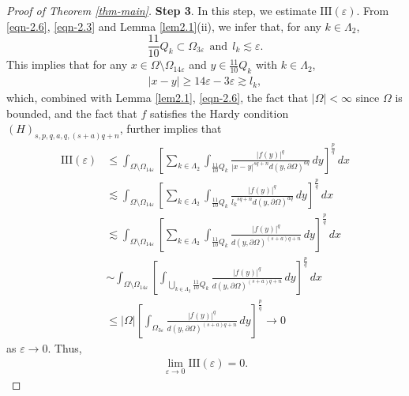 \documentclass[11pt,twoside]{article}
\def\Qk{\frac{11}{10}Q_k}
\def\blz{\Lambda}
\def\boz{{\Omega}}
\def\vez{\varepsilon}
\def\pa{\partial}                %
\def\huae{\varepsilon}
\def\bozthreee{\boz_{3\huae}}
\theoremstyle{mylem}
\theoremstyle{definition}
\numberwithin{equation}{section}
\begin{document}
\begin{proof}[Proof of Theorem \ref{thm-main}]
{\bf Step 3}. In this step, we estimate $\mathrm{III}(\vez)$. 
From \eqref{eqn-2.6}, \eqref{eqn-2.3} and Lemma \ref{lem2.1}(ii),
we infer that, for any $k\in\blz_2$,  
$$\Qk\subset\Omega_{3\varepsilon}
\ \ \text{and}\ \ l_k\lesssim \varepsilon.
$$
This implies that for any $x\in\Omega \setminus \Omega_{14\varepsilon}$ and $y\in\Qk$ with $k\in\blz_2$,
\begin{align}\label{eqn-8.8}
|x-y|\geq 14\varepsilon-3\varepsilon\gtrsim l_k,
\end{align}
which, combined with Lemma \ref{lem2.1}, \eqref{eqn-2.6},
the fact that $|\Omega|<\infty$ since $\Omega$ is bounded, and the fact that $f$ satisfies the Hardy condition $(H)_{s,p,q,a,q,(s+a)q+n}$, further implies that
\begin{align*}
\mathrm{III}(\vez) &\leq \int_{\Omega \setminus \Omega_{14\varepsilon}} \left[ \sum_{k\in\Lambda_2}\int_{ \Qk} \frac{| f(y)|^q}{|x - y|^{s q + n}d(y,\pa\boz)^{aq}}\,dy \right]^{\frac{p}{q}}\,dx \\
&\lesssim \int_{\Omega \setminus \Omega_{14\varepsilon}} \left[ \sum_{k\in\Lambda_2}\int_{ \Qk} \frac{| f(y)|^q}{{l_k}^{s q + n}d(y,\pa\boz)^{aq}}\,dy \right]^{\frac{p}{q}}\,dx  \\
&\lesssim \int_{\Omega \setminus \Omega_{14\varepsilon}} \left[ \sum_{k\in\Lambda_2}\int_{ \Qk} \frac{| f(y)|^q}{d(y,\pa\boz)^{(s+a)q+n}}\,dy \right]^{\frac{p}{q}}\,dx  \\
&\sim\int_{\Omega \setminus \Omega_{14\varepsilon}} \left[ \int_{\bigcup_{k \in \Lambda_2} \Qk} \frac{| f(y)|^q}{d(y,\pa\boz)^{(s+a)q+n}}\,dy \right]^{\frac{p}{q}}\,dx  \\
&\leq \left|\boz\right| \left[ \int_{\bozthreee} \frac{| f(y)|^q}{d(y,\pa\boz)^{(s+a)q+n}}\,dy \right]^{\frac{p}{q}}\to 0 
\end{align*}
as $\varepsilon \to 0$. Thus,
\begin{align}\label{eqn-4.7}
\lim_{\varepsilon \to 0}\mathrm{III}(\vez)= 0.
\end{align}


\end{proof}
\end{document}
